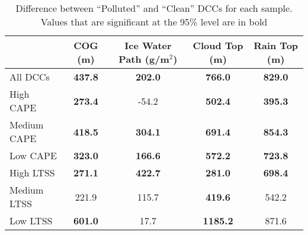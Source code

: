 \begin{table}[t]
\caption{Difference between ``Polluted'' and ``Clean'' DCCs for each sample.  Values that are significant at the 95\% level are in bold}\label{sigtable}
\begin{center}
\begin{tabular}{l | cccc}
\hline
 & COG (m) & Ice Water Path (g/m$^2$) & Cloud Top (m) & Rain Top (m) \\
\hline
All DCCs & \textbf{437.8} & \textbf{202.0} & \textbf{766.0} & \textbf{829.0} \\
High CAPE &  \textbf{273.4} & -54.2 & \textbf{502.4} & \textbf{395.3}  \\
Medium CAPE  &  \textbf{418.5}  &  \textbf{304.1}  &  \textbf{691.4}  &  \textbf{854.3}  \\
Low CAPE  &  \textbf{323.0}  &  \textbf{166.6}  &  \textbf{572.2}  &  \textbf{723.8}    \\
High LTSS  &  \textbf{271.1}  &  \textbf{422.7}  &  \textbf{281.0}  &  \textbf{698.4}  \\
Medium LTSS  &  221.9  &  115.7  &  \textbf{419.6}  &  542.2  \\ 
Low LTSS  &  \textbf{601.0}  &  17.7  &  \textbf{1185.2}  &  871.6\\
\hline
\end{tabular}
\end{center}
\end{table}

